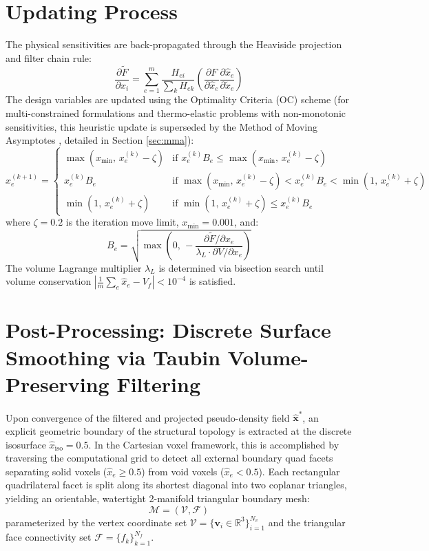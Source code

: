 \documentclass[11pt, a4paper]{article}
\begin{document}
\section{Updating Process}
The physical sensitivities are back-propagated through the Heaviside projection and filter chain rule:
\begin{equation}
\frac{\partial \tilde{F}}{\partial x_i} = \sum_{e=1}^m \frac{H_{ei}}{\sum_k H_{ek}} \left( \frac{\partial F}{\partial \hat{x}_e} \frac{\partial \hat{x}_e}{\partial \tilde{x}_e} \right)
\end{equation}
The design variables are updated using the Optimality Criteria (OC) scheme \cite{sigmund2001, bendsoe2003} (for multi-constrained formulations and thermo-elastic problems with non-monotonic sensitivities, this heuristic update is superseded by the Method of Moving Asymptotes \cite{svanberg1987}, detailed in Section \ref{sec:mma}):
\begin{equation}
x_e^{(k+1)} = \begin{cases}
\max(x_{\min}, \, x_e^{(k)} - \zeta) & \text{if } x_e^{(k)} B_e \le \max(x_{\min}, \, x_e^{(k)} - \zeta) \\[4pt]
x_e^{(k)} B_e & \text{if } \max(x_{\min}, \, x_e^{(k)} - \zeta) < x_e^{(k)} B_e < \min(1, \, x_e^{(k)} + \zeta) \\[4pt]
\min(1, \, x_e^{(k)} + \zeta) & \text{if } \min(1, \, x_e^{(k)} + \zeta) \le x_e^{(k)} B_e
\end{cases}
\end{equation}
where $\zeta = 0.2$ is the iteration move limit, $x_{\min} = 0.001$, and:
\begin{equation}
B_e = \sqrt{\max\left(0, \, -\frac{\partial \tilde{F} / \partial x_e}{\lambda_L \cdot \partial V / \partial x_e}\right)}
\end{equation}
The volume Lagrange multiplier $\lambda_L$ is determined via bisection search until volume conservation $|\frac{1}{m}\sum_e \hat{x}_e - V_f| < 10^{-4}$ is satisfied.

\section{Post-Processing: Discrete Surface Smoothing via Taubin Volume-Preserving Filtering}
\label{sec:taubin}
Upon convergence of the filtered and projected pseudo-density field $\hat{\mathbf{x}}^*$, an explicit geometric boundary of the structural topology is extracted at the discrete isosurface $\hat{x}_{\text{iso}} = 0.5$. In the Cartesian voxel framework, this is accomplished by traversing the computational grid to detect all external boundary quad facets separating solid voxels ($\hat{x}_e \ge 0.5$) from void voxels ($\hat{x}_e < 0.5$). Each rectangular quadrilateral facet is split along its shortest diagonal into two coplanar triangles, yielding an orientable, watertight 2-manifold triangular boundary mesh:
\begin{equation}
\mathcal{M} = (\mathcal{V}, \mathcal{F})
\end{equation}
parameterized by the vertex coordinate set $\mathcal{V} = \{\mathbf{v}_i \in \mathbb{R}^3\}_{i=1}^{N_v}$ and the triangular face connectivity set $\mathcal{F} = \{f_k\}_{k=1}^{N_f}$.
\end{document}
